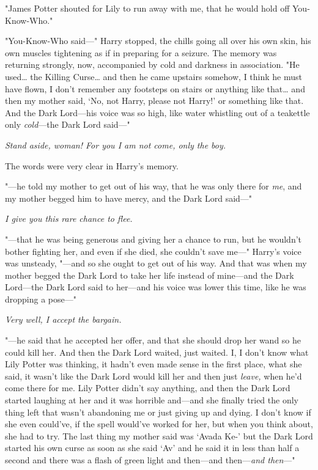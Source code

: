 "James Potter shouted for Lily to run away with me, that he would hold off
You-Know-Who."

"You-Know-Who said---" Harry stopped, the chills going all over his own skin,
his own muscles tightening as if in preparing for a seizure. The memory was
returning strongly, now, accompanied by cold and darkness in association. "He
used{\ldots} the Killing Curse{\ldots} and then he came upstairs somehow, I
think he must have flown, I don't remember any footsteps on stairs or anything
like that{\ldots} and then my mother said, `No, not Harry, please not Harry!'
or something like that. And the Dark Lord---his voice was so high, like water
whistling out of a teakettle only \emph{cold}---the Dark Lord said---"

\emph{Stand aside, woman! For you I am not come, only the boy.}

The words were very clear in Harry's memory.

"---he told my mother to get out of his way, that he was only there for
\emph{me}, and my mother begged him to have mercy, and the Dark Lord said---"

\emph{I give you this rare chance to flee.}

"---that he was being generous and giving her a chance to run, but he wouldn't
bother fighting her, and even if she died, she couldn't save me---" Harry's
voice was unsteady, "---and so she ought to get out of his way. And that was
when my mother begged the Dark Lord to take her life instead of mine---and the
Dark Lord---the Dark Lord said to her---and his voice was lower this time, like
he was dropping a pose---"

\emph{Very well, I accept the bargain.}

"---he said that he accepted her offer, and that she should drop her wand so he
could kill her. And then the Dark Lord waited, just waited. I, I don't know
what Lily Potter was thinking, it hadn't even made sense in the first place,
what she said, it wasn't like the Dark Lord would kill her and then just
\emph{leave,} when he'd come there for me. Lily Potter didn't say anything, and
then the Dark Lord started laughing at her and it was horrible and---and she
finally tried the only thing left that wasn't abandoning me or just giving up
and dying. I don't know if she even could've, if the spell would've worked for
her, but when you think about, she had to try. The last thing my mother said
was `Avada Ke-' but the Dark Lord started his own curse as soon as she said
`Av' and he said it in less than half a second and there was a flash of green
light and then---and then---\emph{and then}---"

